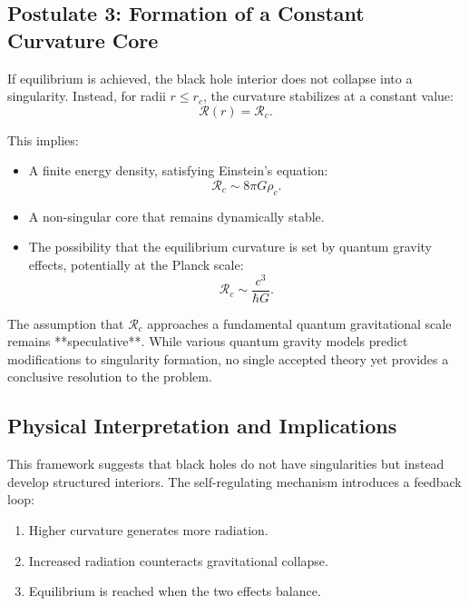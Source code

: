\subsection{Postulate 3: Formation of a Constant Curvature Core}
If equilibrium is achieved, the black hole interior does not collapse into a singularity. Instead, for radii \( r \leq r_c \), the curvature stabilizes at a constant value:
\begin{equation}
    \mathcal{R}(r) = \mathcal{R}_c.
\end{equation}

This implies:
\begin{itemize}
    \item A finite energy density, satisfying Einstein’s equation:
    \begin{equation}
        \mathcal{R}_c \sim 8\pi G \rho_c.
    \end{equation}
    \item A non-singular core that remains dynamically stable.
    \item The possibility that the equilibrium curvature is set by quantum gravity effects, potentially at the Planck scale:
    \begin{equation}
        \mathcal{R}_c \sim \frac{c^3}{\hbar G}.
    \end{equation}
\end{itemize}

The assumption that \( \mathcal{R}_c \) approaches a fundamental quantum gravitational scale remains **speculative**. While various quantum gravity models predict modifications to singularity formation, no single accepted theory yet provides a conclusive resolution to the problem.

\subsection{Physical Interpretation and Implications}
This framework suggests that black holes do not have singularities but instead develop structured interiors. The self-regulating mechanism introduces a feedback loop:
\begin{enumerate}
    \item Higher curvature generates more radiation.
    \item Increased radiation counteracts gravitational collapse.
    \item Equilibrium is reached when the two effects balance.
\end{enumerate}

